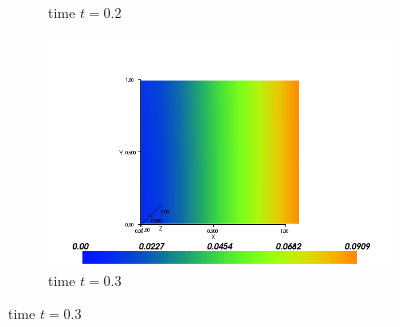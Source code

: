 \documentclass[twoside]{article}
\begin{document}
\begin{figure}
\begin{subfigure}[h]{0.31\textwidth}
                \caption{time \(  t = 0.2\)}
                \label{fig:test_t=0.2}
        \end{subfigure}
        \begin{subfigure}[h]{0.31\textwidth}
                \centering
                \includegraphics[width=\textwidth]{test_t=03}
                \caption{time \( t = 0.3\)}
                \label{fig:test_t=0.3}
        \end{subfigure}
        

\end{figure}
\end{document}
